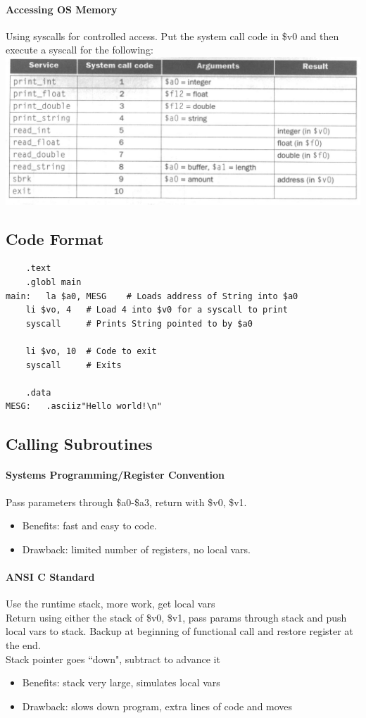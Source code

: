 \documentclass[12 pt]{article}
\begin{document}
\paragraph{Accessing OS Memory}
Using syscalls for controlled access. Put the system call code in \$v0 and then execute a syscall for the following:
\\ \includegraphics[scale=0.3]{sys}
\subsection{Code Format}
\begin{lstlisting}
	.text
	.globl main
main:	la $a0, MESG	# Loads address of String into $a0
	li $vo, 4	# Load 4 into $v0 for a syscall to print
	syscall		# Prints String pointed to by $a0
	
	li $vo, 10	# Code to exit
	syscall		# Exits

	.data
MESG:	.asciiz"Hello world!\n"
\end{lstlisting}
\subsection{Calling Subroutines}
\paragraph{Systems Programming/Register Convention}
Pass parameters through \$a0-\$a3, return with \$v0, \$v1.
\begin{itemize}
\item Benefits: fast and easy to code.
\item Drawback: limited number of registers, no local vars.
\end{itemize}

\paragraph{ANSI C Standard} Use the runtime stack, more work, get local vars
\\ Return using either the stack of \$v0, \$v1, pass params through stack and push local vars to stack. Backup at beginning of functional call and restore register at the end.
\\ Stack pointer goes ``down", subtract to advance it
\begin{itemize}
\item Benefits: stack very large, simulates local vars
\item Drawback: slows down program, extra lines of code and moves
\end{itemize}
\end{document}
